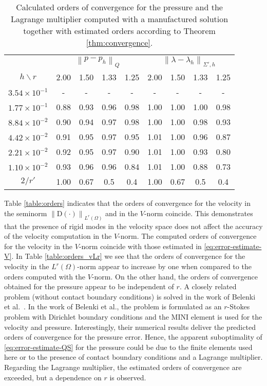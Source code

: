 \documentclass[onefignum,onetabnum]{siamart190516}
\newcommand{\bD}{\boldsymbol{\mathrm{D}}}
\newcommand{\nrm}[1]{\left\lVert#1\right\rVert}
\begin{document}
\begin{table}
\centering
\caption{Calculated orders of convergence for the pressure and the Lagrange multiplier computed with a manufactured solution together with estimated orders according to Theorem \ref{thm:convergence}.}
\label{table:orders_pl}
	\begin{tabular}{c|cccc|cccc}
	\toprule
		& \multicolumn{4}{|c|}{$\nrm{p-p_h}_Q$} & \multicolumn{4}{c}{$\nrm{\lambda - \lambda_h}_{\Sigma',h}$} \\
		\cmidrule{2-9}
		$h \backslash r$ &2.00& 1.50& 1.33& 1.25 & 2.00& 1.50& 1.33& 1.25 \\
		\midrule
		$3.54 \times 10^{-1}$& - & - &- & - &- & - &- & - \\
		$1.77 \times 10^{-1}$& 0.88& 0.93& 0.96& 0.98& 1.00& 1.00& 1.00& 0.98\\
		$8.84 \times 10^{-2}$& 0.90& 0.94& 0.97& 0.98& 1.00& 1.00& 0.98& 0.93\\
		$4.42 \times 10^{-2}$& 0.91& 0.95& 0.97& 0.95& 1.01& 1.00& 0.96& 0.87\\
		$2.21 \times 10^{-2}$& 0.92& 0.95& 0.97& 0.90& 1.01& 1.00& 0.93& 0.80\\
		$1.10 \times 10^{-2}$& 0.93& 0.96& 0.96& 0.84& 1.01& 1.00& 0.88& 0.73\\
		\midrule
		$2/r' $& 1.00& 0.67& 0.5& 0.4& 1.00& 0.67& 0.5& 0.4 \\
	\bottomrule
	\end{tabular}	
\end{table}

Table \ref{table:orders} indicates that the orders of convergence for the velocity in the seminorm $\nrm{\bD(\cdot)}_{L^r(\Omega)}$ and in the $V$-norm coincide. This demonstrates that the presence of rigid modes in the velocity space does not affect the accuracy of the velocity computation in the $V$-norm. The computed orders of convergence for the velocity in the $V$-norm coincide with those estimated in \eqref{eq:error-estimate-V}. In Table \ref{table:orders_vLr} we see that the orders of convergence for the velocity in the $L^r(\Omega)$-norm appear to increase by one when compared to the orders computed with the $V$-norm. On the other hand, the orders of convergence obtained for the pressure appear to be independent of $r$. A closely related problem (without contact boundary conditions) is solved in the work of Belenki et al.~\cite{belenki2012}. In the work of Belenki et al., the problem is formulated as an $r$-Stokes problem with Dirichlet boundary conditions and the MINI element is used for the velocity and pressure. Interestingly, their numerical results deliver the predicted orders of convergence for the pressure error. Hence, the apparent suboptimality of \eqref{eq:error-estimate-QS} for the pressure could be due to the finite elements used here or to the presence of contact boundary conditions and a Lagrange multiplier. Regarding the Lagrange multiplier, the estimated orders of convergence are exceeded, but a dependence on $r$ is observed.
\end{document}
